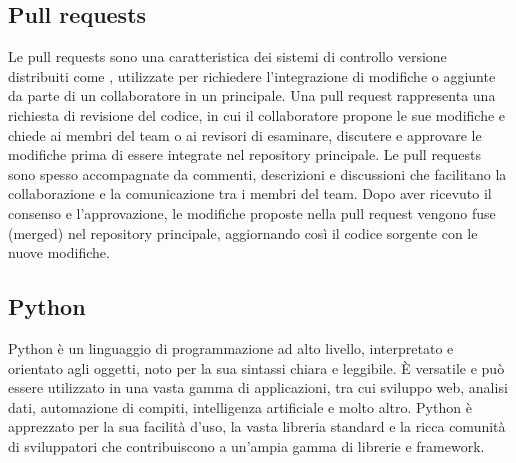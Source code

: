 \subsection*{Pull requests}
Le pull requests sono una caratteristica dei sistemi di controllo versione distribuiti come , utilizzate per richiedere l'integrazione di modifiche o aggiunte da parte di un collaboratore in un  principale. Una pull request rappresenta una richiesta di revisione del codice, in cui il collaboratore propone le sue modifiche e chiede ai membri del team o ai revisori di esaminare, discutere e approvare le modifiche prima di essere integrate nel repository principale. Le pull requests sono spesso accompagnate da commenti, descrizioni e discussioni che facilitano la collaborazione e la comunicazione tra i membri del team. Dopo aver ricevuto il consenso e l'approvazione, le modifiche proposte nella pull request vengono fuse (merged) nel repository principale, aggiornando così il codice sorgente con le nuove modifiche.

\vspace{2em}
\subsection*{Python}
Python è un linguaggio di programmazione ad alto livello, interpretato e orientato agli oggetti, noto per la sua sintassi chiara e leggibile. È versatile e può essere utilizzato in una vasta gamma di applicazioni, tra cui sviluppo web, analisi dati, automazione di compiti, intelligenza artificiale e molto altro. Python è apprezzato per la sua facilità d'uso, la vasta libreria standard e la ricca comunità di sviluppatori che contribuiscono a un'ampia gamma di librerie e framework.
